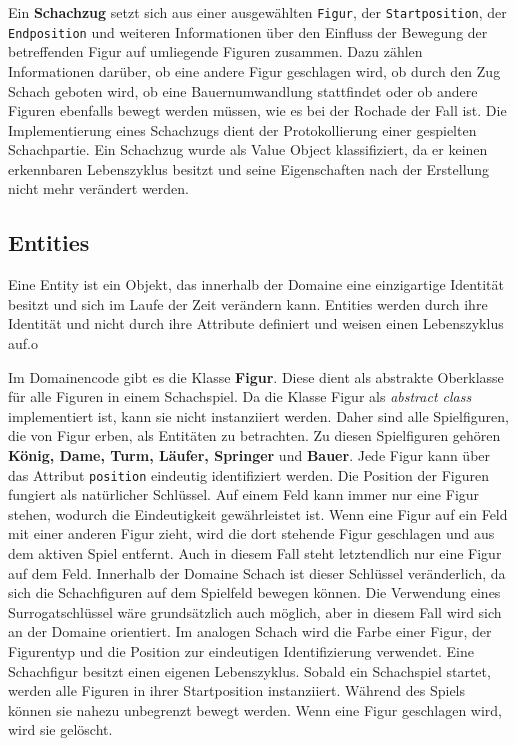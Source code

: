 Ein \textbf{Schachzug} setzt sich aus einer ausgewählten \texttt{Figur}, der \texttt{Startposition}, der \texttt{Endposition} und weiteren Informationen über den Einfluss der Bewegung der betreffenden Figur auf umliegende Figuren zusammen. 
Dazu zählen Informationen darüber, ob eine andere Figur geschlagen wird, ob durch den Zug Schach geboten wird, ob eine Bauernumwandlung stattfindet oder ob andere Figuren ebenfalls bewegt werden müssen, wie es bei der Rochade der Fall ist. 
Die Implementierung eines Schachzugs dient der Protokollierung einer gespielten Schachpartie. 
Ein Schachzug wurde als Value Object klassifiziert, da er keinen erkennbaren Lebenszyklus besitzt und seine Eigenschaften nach der Erstellung nicht mehr verändert werden. 

\subsection*{Entities}

Eine Entity ist ein Objekt, das innerhalb der Domaine eine einzigartige Identität besitzt und sich im Laufe der Zeit verändern kann. 
Entities werden durch ihre Identität und nicht durch ihre Attribute definiert und weisen einen Lebenszyklus auf.o

Im Domainencode gibt es die Klasse \textbf{Figur}. 
Diese dient als abstrakte Oberklasse für alle Figuren in einem Schachspiel. 
Da die Klasse Figur als \textit{abstract class} implementiert ist, kann sie nicht instanziiert werden.
Daher sind alle Spielfiguren, die von Figur erben, als Entitäten zu betrachten. 
Zu diesen Spielfiguren gehören \textbf{König, Dame, Turm, Läufer, Springer} und \textbf{Bauer}. 
Jede Figur kann über das Attribut \texttt{position} eindeutig identifiziert werden. 
Die Position der Figuren fungiert als natürlicher Schlüssel. 
Auf einem Feld kann immer nur eine Figur stehen, wodurch die Eindeutigkeit gewährleistet ist. 
Wenn eine Figur auf ein Feld mit einer anderen Figur zieht, wird die dort stehende Figur geschlagen und aus dem aktiven Spiel entfernt. 
Auch in diesem Fall steht letztendlich nur eine Figur auf dem Feld. 
Innerhalb der Domaine \glqq Schach\grqq{} ist dieser Schlüssel veränderlich, da sich die Schachfiguren auf dem Spielfeld bewegen können. 
Die Verwendung eines Surrogatschlüssel wäre grundsätzlich auch möglich, aber in diesem Fall wird sich an der Domaine orientiert.
Im analogen Schach wird die Farbe einer Figur, der Figurentyp und die Position zur eindeutigen Identifizierung verwendet.   
Eine Schachfigur besitzt einen eigenen Lebenszyklus. Sobald ein Schachspiel startet, werden alle Figuren in ihrer Startposition instanziiert. Während des Spiels können sie nahezu unbegrenzt bewegt werden. Wenn eine Figur geschlagen wird, wird sie gelöscht.


